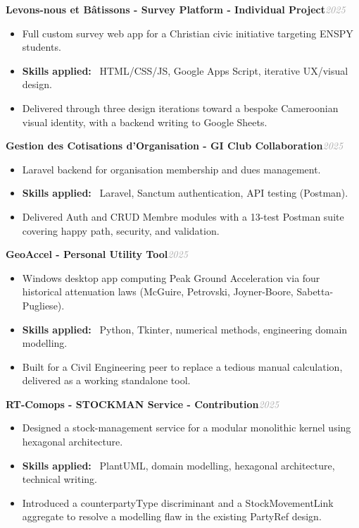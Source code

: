 \documentclass[10pt, a4paper]{article}
\newcommand{\entryhead}[2]{%
  \noindent\textbf{#1}\hfill{\small\textit{\textcolor{darkgray}{#2}}}\\[-4pt]%
}
\newcommand{\blabel}[1]{\textbf{#1}\ }
\begin{document}
\vspace{4pt}
\entryhead{Levons-nous et Bâtissons - Survey Platform \normalfont\small- Individual Project}{2025}
\begin{itemize}
  \item Full custom survey web app for a Christian civic initiative targeting ENSPY students.
  \item \blabel{Skills applied:} HTML/CSS/JS, Google Apps Script, iterative UX/visual design.
  \item Delivered through three design iterations toward a bespoke Cameroonian visual identity,
        with a backend writing to Google Sheets.
\end{itemize}

\vspace{4pt}
\entryhead{Gestion des Cotisations d'Organisation \normalfont\small- GI Club Collaboration}{2025}
\begin{itemize}
  \item Laravel backend for organisation membership and dues management.
  \item \blabel{Skills applied:} Laravel, Sanctum authentication, API testing (Postman).
  \item Delivered Auth and CRUD Membre modules with a 13-test Postman suite covering happy path,
        security, and validation.
\end{itemize}

\vspace{4pt}
\entryhead{GeoAccel \normalfont\small- Personal Utility Tool}{2025}
\begin{itemize}
  \item Windows desktop app computing Peak Ground Acceleration via four historical attenuation
        laws (McGuire, Petrovski, Joyner-Boore, Sabetta-Pugliese).
  \item \blabel{Skills applied:} Python, Tkinter, numerical methods, engineering domain modelling.
  \item Built for a Civil Engineering peer to replace a tedious manual calculation, delivered as
        a working standalone tool.
\end{itemize}

\vspace{4pt}
\entryhead{RT-Comops - STOCKMAN Service \normalfont\small- Contribution}{2025}
\begin{itemize}
  \item Designed a stock-management service for a modular monolithic kernel using hexagonal
        architecture.
  \item \blabel{Skills applied:} PlantUML, domain modelling, hexagonal architecture, technical
        writing.
  \item Introduced a counterpartyType discriminant and a StockMovementLink aggregate to resolve
        a modelling flaw in the existing PartyRef design.
\end{itemize}
\end{document}
